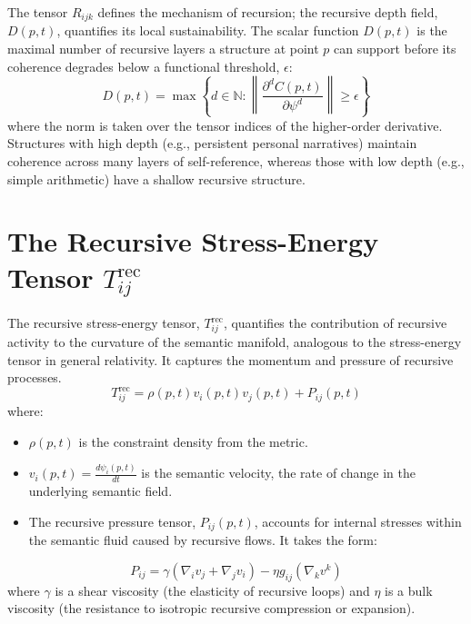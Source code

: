 The tensor \(R_{ijk}\) defines the mechanism of recursion; the recursive depth field, \(D(p, t)\), quantifies its local sustainability. The scalar function \(D(p,t)\) is the maximal number of recursive layers a structure at point \(p\) can support before its coherence degrades below a functional threshold, \(\epsilon\):
\begin{equation}
D(p, t) = \max \left\{ d \in \mathbb{N} : \left\| \frac{\partial^d C(p,t)}{\partial \psi^d} \right\| \geq \epsilon \right\}
\end{equation}
where the norm is taken over the tensor indices of the higher-order derivative. Structures with high depth (e.g., persistent personal narratives) maintain coherence across many layers of self-reference, whereas those with low depth (e.g., simple arithmetic) have a shallow recursive structure.

\section{\texorpdfstring{The Recursive Stress-Energy Tensor $T_{ij}^{\text{rec}}$}{The Recursive Stress-Energy Tensor Tij\_rec}}

The recursive stress-energy tensor, \(T_{ij}^{\text{rec}}\), quantifies the contribution of recursive activity to the curvature of the semantic manifold, analogous to the stress-energy tensor in general relativity. It captures the momentum and pressure of recursive processes.
\begin{equation}
T_{ij}^{\text{rec}} = \rho(p,t) v_i(p,t) v_j(p,t) + P_{ij}(p,t)
\end{equation}
where:
\begin{itemize}
    \item \(\rho(p,t)\) is the constraint density from the metric.
    \item \(v_i(p,t) = \frac{d\psi_i(p,t)}{dt}\) is the semantic velocity, the rate of change in the underlying semantic field.
    \item The recursive pressure tensor, \(P_{ij}(p,t)\), accounts for internal stresses within the semantic fluid caused by recursive flows. It takes the form:
\end{itemize}
\begin{equation}
P_{ij} = \gamma(\nabla_i v_j + \nabla_j v_i) - \eta g_{ij} (\nabla_k v^k)
\end{equation}
where \(\gamma\) is a shear viscosity (the elasticity of recursive loops) and \(\eta\) is a bulk viscosity (the resistance to isotropic recursive compression or expansion).